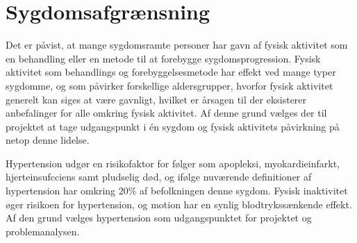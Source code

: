 \section{Sygdomsafgrænsning}
Det er påvist, at mange sygdomsramte personer har gavn af fysisk aktivitet som en behandling eller en metode til at forebygge sygdomsprogression. \cite{motionsraad2007,pedersen2011} Fysisk aktivitet som behandlings og forebyggelsesmetode har effekt ved mange typer sygdomme, og som påvirker forskellige aldersgrupper, hvorfor fysisk aktivitet generelt kan siges at være gavnligt, hvilket er årsagen til der eksisterer anbefalinger for alle omkring fysisk aktivitet. \cite{pedersen2011} Af denne grund vælges der til projektet at tage udgangspunkt i én sygdom og fysisk aktivitets påvirkning på netop denne lidelse.

Hypertension udgør en risikofaktor for følger som apopleksi, myokardieinfarkt, hjerteinsufcciens samt pludselig død, og ifølge nuværende definitioner af hypertension har omkring $20\%$ af befolkningen denne sygdom. \cite{pedersen2011} Fysisk inaktivitet øger risikoen for hypertension, og motion har en synlig blodtrykssænkende effekt. \cite{olsen2015} Af den grund vælges hypertension som udgangspunktet for projektet og problemanalysen. 